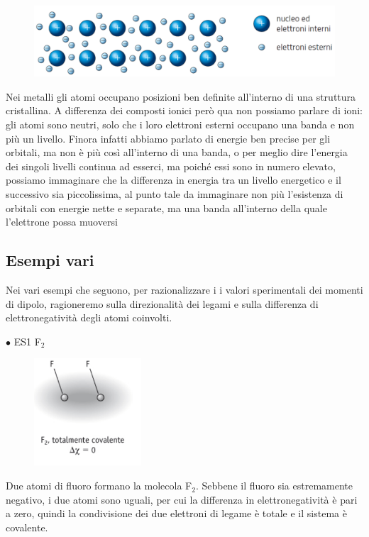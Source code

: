 \begin{figure}[htp]
    \centering
    \includegraphics[width=12cm]{immagini/legame-metallico.png}
\end{figure}

Nei metalli gli atomi occupano posizioni ben definite all'interno di una struttura cristallina. A differenza dei composti ionici però qua non possiamo parlare di ioni: gli atomi sono neutri, solo che i loro elettroni esterni occupano una banda e non più un livello. Finora infatti abbiamo parlato di energie ben precise per gli orbitali, ma non è più così all'interno di una banda, o per meglio dire l'energia dei singoli livelli continua ad esserci, ma poiché essi sono in numero elevato, possiamo immaginare che la differenza in energia tra un livello energetico e il successivo sia piccolissima, al punto tale da immaginare non più l'esistenza di orbitali con energie nette e separate, ma una banda all'interno della quale l'elettrone possa muoversi

\subsection{Esempi vari}
Nei vari esempi che seguono, per razionalizzare i i valori sperimentali dei momenti di dipolo, ragioneremo sulla direzionalità dei legami e sulla differenza di elettronegatività degli atomi coinvolti.

\vspace{0.2cm}$\bullet$ ES1 F$_2$

\begin{figure}[htp]
    \centering
    \includegraphics[width=4cm]{immagini/F_2.png}
\end{figure}

Due atomi di fluoro formano la molecola F$_2$. Sebbene il fluoro sia estremamente negativo, i due atomi sono uguali, per cui la differenza in elettronegatività è pari a zero, quindi la condivisione dei due elettroni di legame è totale e il sistema è covalente.

